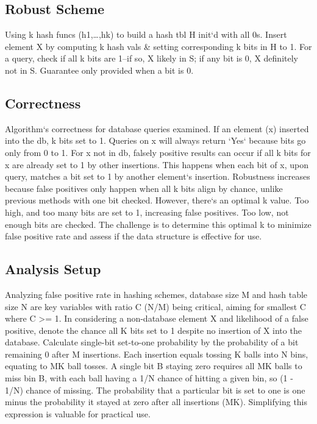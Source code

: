 \subsection*{Robust Scheme}
Using k hash funcs (h1,\ldots,hk) to build a hash tbl H init`d with all 0s.
Insert element X by computing k hash vals \& setting corresponding k bits in H to 1.
For a query, check if all k bits are 1--if so, X likely in S; if any bit is 0, X definitely not in S\@.
Guarantee only provided when a bit is 0.

\subsection*{Correctness}
Algorithm`s correctness for database queries examined.
If an element (x) inserted into the db, k bits set to 1.
Queries on x will always return `Yes` because bits go only from 0 to 1.
For x not in db, falsely positive results can occur if all k bits for x are already set to 1 by other insertions.
This happens when each bit of x, upon query, matches a bit set to 1 by another element`s insertion.
Robustness increases because false positives only happen when all k bits align by chance, unlike previous methods with one bit checked.
However, there`s an optimal k value.
Too high, and too many bits are set to 1, increasing false positives.
Too low, not enough bits are checked.
The challenge is to determine this optimal k to minimize false positive rate and assess if the data structure is effective for use.

\subsection*{Analysis Setup}
Analyzing false positive rate in hashing schemes, database size M and hash table size N are key variables with ratio C (N/M) being critical, aiming for smallest C where C \textgreater{}= 1.
In considering a non-database element X and likelihood of a false positive, denote the chance all K bits set to 1 despite no insertion of X into the database.
Calculate single-bit set-to-one probability by the probability of a bit remaining 0 after M insertions.
Each insertion equals tossing K balls into N bins, equating to MK ball tosses.
A single bit B staying zero requires all MK balls to miss bin B, with each ball having a 1/N chance of hitting a given bin, so (1 - 1/N) chance of missing.
The probability that a particular bit is set to one is one minus the probability it stayed at zero after all insertions (MK).
Simplifying this expression is valuable for practical use.

